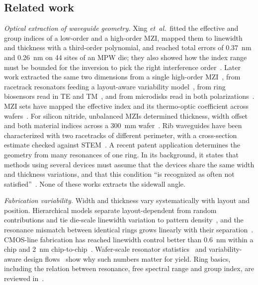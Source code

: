 \subsection{Related work}

\textit{Optical extraction of waveguide geometry.} Xing \textit{et~al.}\ fitted the effective and group indices of a
low-order and a high-order MZI, mapped them to linewidth and thickness with a third-order polynomial, and reached
total errors of \qty{0.37}{nm} and \qty{0.26}{nm} on 44 sites of an MPW die; they also showed how the index range
must be bounded for the inversion to pick the right interference order~\cite{xing2018}. Later work extracted the same two dimensions
from a single high-order MZI~\cite{liu2025}, from racetrack resonators feeding a layout-aware variability
model~\cite{lu2017}, from ring biosensors read in TE and TM~\cite{atsumi2012}, and from microdisks read in both
polarizations~\cite{zortman2010}. MZI sets have mapped the effective index and its thermo-optic coefficient across
wafers~\cite{dwivedi2015}. For silicon nitride, unbalanced MZIs determined thickness, width offset and both material
indices across a \qty{300}{mm} wafer~\cite{butt2024}. Rib waveguides have been characterized with two racetracks of
different perimeter, with a cross-section estimate checked against STEM~\cite{zhang2024}. A recent patent
application determines the geometry from many resonances of one ring. In its background, it states that methods
using several devices must assume that the devices share the same width and thickness variations, and that this
condition ``is recognized as often not satisfied''~\cite{nrc2026}. None of these works extracts the sidewall angle.

\textit{Fabrication variability.} Width and thickness vary systematically with layout and position. Hierarchical
models separate layout-dependent from random contributions and tie die-scale linewidth variation to pattern
density~\cite{xing2023}, and the resonance mismatch between identical rings grows linearly with their
separation~\cite{chrostowski2014}. CMOS-line fabrication has reached linewidth control better than \qty{0.6}{nm}
within a chip and \qty{2}{nm} chip-to-chip~\cite{selvaraja2010}. Wafer-scale resonator statistics~\cite{robinson2025,mdpi2025,aim2023}
and variability-aware design flows~\cite{bogaerts2018} show why such numbers matter for yield. Ring basics,
including the relation between resonance, free spectral range and group index, are reviewed
in~\cite{bogaerts2012,chrostowski2015}.

